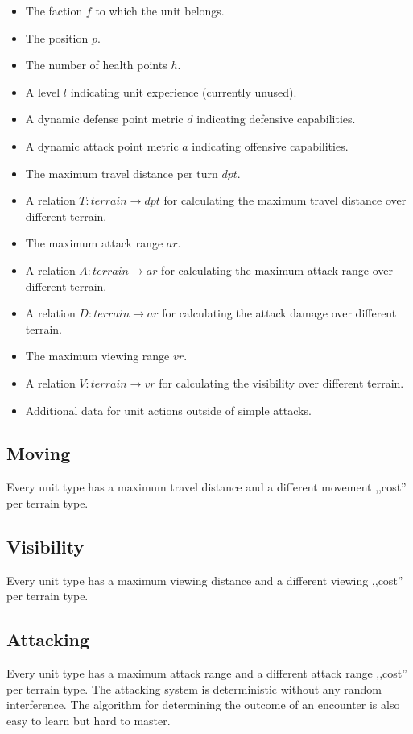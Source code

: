 \begin{itemize}
    \item The faction $f$ to which the unit  belongs.
    \item The position $p$.
    \item The number of health points $h$.
    \item A level $l$ indicating unit  experience (currently unused).
    \item A dynamic defense point metric $d$ indicating defensive capabilities.
    \item A dynamic attack point metric $a$ indicating offensive capabilities.
    \item The maximum travel distance per turn $dpt$.
    \item A relation $T: terrain \to dpt$ for calculating the maximum travel distance over different terrain.
    \item The maximum attack range $ar$.
    \item A relation $A: terrain \to ar$ for calculating the maximum attack range over different terrain.
    \item A relation $D: terrain \to ar$ for calculating the attack damage over different terrain.
    \item The maximum viewing range $vr$.
    \item A relation $V: terrain \to vr$ for calculating the visibility over different terrain.
    \item Additional data for unit  actions outside of simple attacks.
\end{itemize}
\subsection{Moving}
Every unit type has a maximum travel distance and a different movement ,,cost'' per terrain type.
\subsection{Visibility}
Every unit type has a maximum viewing distance and a different viewing ,,cost'' per terrain type.
\subsection{Attacking}
Every unit type has a maximum attack range and a different attack range ,,cost'' per terrain type.
The attacking system is deterministic without any random interference. The algorithm for determining the outcome
of an encounter is also easy to learn but hard to master.


